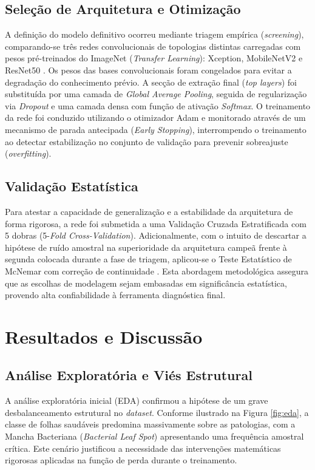 \documentclass[12pt, a4paper]{article}
\begin{document}
\subsection{Seleção de Arquitetura e Otimização}
A definição do modelo definitivo ocorreu mediante triagem empírica (\textit{screening}), comparando-se três redes convolucionais de topologias distintas carregadas com pesos pré-treinados do ImageNet (\textit{Transfer Learning}): Xception, MobileNetV2 e ResNet50 \citep{he2016deep}. Os pesos das bases convolucionais foram congelados para evitar a degradação do conhecimento prévio. A secção de extração final (\textit{top layers}) foi substituída por uma camada de \textit{Global Average Pooling}, seguida de regularização via \textit{Dropout} e uma camada densa com função de ativação \textit{Softmax}. O treinamento da rede foi conduzido utilizando o otimizador Adam e monitorado através de um mecanismo de parada antecipada (\textit{Early Stopping}), interrompendo o treinamento ao detectar estabilização no conjunto de validação para prevenir sobreajuste (\textit{overfitting}).

\subsection{Validação Estatística}
Para atestar a capacidade de generalização e a estabilidade da arquitetura de forma rigorosa, a rede foi submetida a uma Validação Cruzada Estratificada com 5 dobras (5-\textit{Fold Cross-Validation}). Adicionalmente, com o intuito de descartar a hipótese de ruído amostral na superioridade da arquitetura campeã frente à segunda colocada durante a fase de triagem, aplicou-se o Teste Estatístico de McNemar com correção de continuidade \citep{mcnemar1947note}. Esta abordagem metodológica assegura que as escolhas de modelagem sejam embasadas em significância estatística, provendo alta confiabilidade à ferramenta diagnóstica final.

\section{Resultados e Discussão}

\subsection{Análise Exploratória e Viés Estrutural}
A análise exploratória inicial (EDA) confirmou a hipótese de um grave desbalanceamento estrutural no \textit{dataset}. Conforme ilustrado na Figura \ref{fig:eda}, a classe de folhas saudáveis predomina massivamente sobre as patologias, com a Mancha Bacteriana (\textit{Bacterial Leaf Spot}) apresentando uma frequência amostral crítica. Este cenário justificou a necessidade das intervenções matemáticas rigorosas aplicadas na função de perda durante o treinamento.
\end{document}
